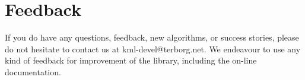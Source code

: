 \documentclass{article}
\begin{document}
\section*{Feedback}

If you do have any questions, feedback, new algorithms, or success stories, 
please do not hesitate to contact us at kml-devel@terborg.net.
We endeavour to use any kind of feedback for improvement of the library, including the
on-line documentation.




\end{document}
